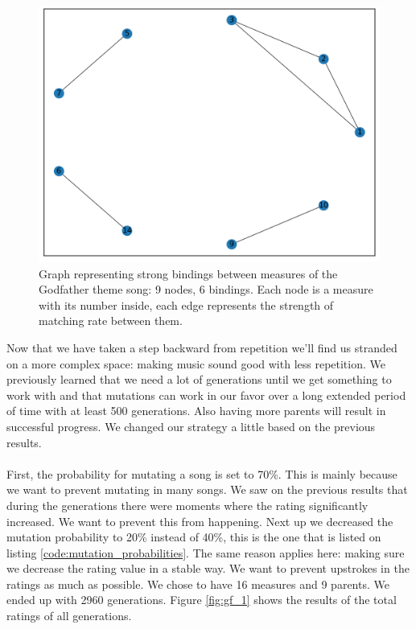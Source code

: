 \documentclass[a4paper]{article}
\begin{document}
\begin{figure}[H]
	\includegraphics[width=\textwidth]{Fotos/bindings_graph/Godfather_16_strong.png}
	\caption{Graph representing strong bindings between measures of the Godfather theme song: 9 nodes, 6 bindings. Each node is a measure with its number inside, each edge represents the strength of matching rate between them.}
	\label{fig:GF_strong_graph2}
\end{figure}

Now that we have taken a step backward from repetition we'll find us stranded on a more complex space: making music sound good with less repetition. We previously learned that we need a lot of generations until we get something to work with and that mutations can work in our favor over a long extended period of time with at least 500 generations. Also having more parents will result in successful progress. We changed our strategy a little based on the previous results.
\\\\
First, the probability for mutating a song is set to 70\%. This is mainly because we want to prevent mutating in many songs. We saw on the previous results that during the generations there were moments where the rating significantly increased. We want to prevent this from happening. Next up we decreased the mutation probability to 20\% instead of 40\%, this is the one that is listed on listing \ref{code:mutation_probabilities}. The same reason applies here: making sure we decrease the rating value in a stable way. We want to prevent upstrokes in the ratings as much as possible. We chose to have 16 measures and 9 parents. We ended up with 2960 generations. Figure \ref{fig:gf_1} shows the results of the total ratings of all generations.
\end{document}
